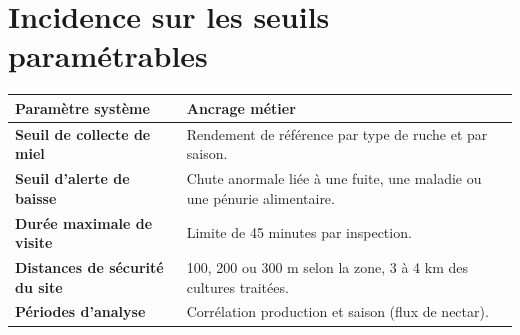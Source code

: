 \section{Incidence sur les seuils paramétrables}
\begin{xltabular}{\textwidth}{>{\bfseries}p{4.5cm} X}
\toprule
\textbf{Paramètre système} & \textbf{Ancrage métier} \\
\midrule
\endhead
Seuil de collecte de miel & Rendement de référence par type de ruche et par saison. \\
Seuil d'alerte de baisse & Chute anormale liée à une fuite, une maladie ou une pénurie alimentaire. \\
Durée maximale de visite & Limite de 45 minutes par inspection. \\
Distances de sécurité du site & 100, 200 ou 300 m selon la zone, 3 à 4 km des cultures traitées. \\
Périodes d'analyse & Corrélation production et saison (flux de nectar). \\
\bottomrule
\end{xltabular}

